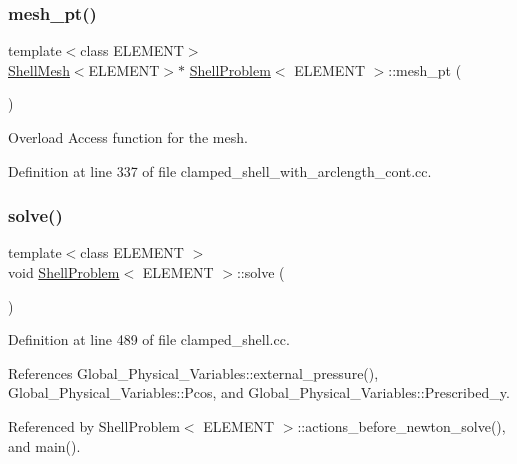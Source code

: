 \subsubsection{\texorpdfstring{mesh\+\_\+pt()}{mesh\_pt()}\hspace{0.1cm}{\footnotesize\ttfamily [2/2]}}
{\footnotesize\ttfamily template$<$class E\+L\+E\+M\+E\+NT$>$ \\
\hyperlink{classShellMesh}{Shell\+Mesh}$<$E\+L\+E\+M\+E\+NT$>$$\ast$ \hyperlink{classShellProblem}{Shell\+Problem}$<$ E\+L\+E\+M\+E\+NT $>$\+::mesh\+\_\+pt (\begin{DoxyParamCaption}{ }\end{DoxyParamCaption})\hspace{0.3cm}{\ttfamily [inline]}}



Overload Access function for the mesh. 



Definition at line 337 of file clamped\+\_\+shell\+\_\+with\+\_\+arclength\+\_\+cont.\+cc.

\mbox{\label{classShellProblem_aa6d150bd1c137edbf4ded27ed044766d}} 
\subsubsection{\texorpdfstring{solve()}{solve()}\hspace{0.1cm}{\footnotesize\ttfamily [1/2]}}
{\footnotesize\ttfamily template$<$class E\+L\+E\+M\+E\+NT $>$ \\
void \hyperlink{classShellProblem}{Shell\+Problem}$<$ E\+L\+E\+M\+E\+NT $>$\+::solve (\begin{DoxyParamCaption}{ }\end{DoxyParamCaption})}



Definition at line 489 of file clamped\+\_\+shell.\+cc.



References Global\+\_\+\+Physical\+\_\+\+Variables\+::external\+\_\+pressure(), Global\+\_\+\+Physical\+\_\+\+Variables\+::\+Pcos, and Global\+\_\+\+Physical\+\_\+\+Variables\+::\+Prescribed\+\_\+y.



Referenced by Shell\+Problem$<$ E\+L\+E\+M\+E\+N\+T $>$\+::actions\+\_\+before\+\_\+newton\+\_\+solve(), and main().

